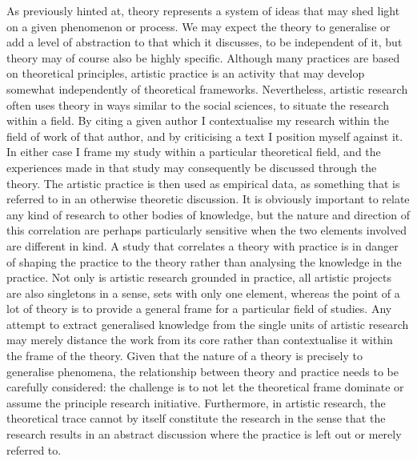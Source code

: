 \documentclass[12pt]{article}
\begin{document}
As previously hinted at, theory represents a system of ideas that may shed light on a given phenomenon or process. We may expect the theory to generalise or add a level of abstraction to that which it discusses, to be independent of it, but theory may of course also be highly specific. Although many practices are based on theoretical principles, artistic practice is an activity that may develop somewhat independently of theoretical frameworks. Nevertheless, artistic research often uses theory in ways similar to the social sciences, to situate the research within a field. By citing a given author I contextualise my research within the field of work of that author, and by criticising a text I position myself against it. In either case I frame my study within a particular theoretical field, and the experiences made in that study may  consequently be  discussed through the theory. The artistic practice is then used as empirical data, as something that is referred to in an otherwise theoretic discussion. It is obviously important to relate any kind of research to other bodies of knowledge, but the nature and direction of this correlation are perhaps particularly sensitive when the two elements involved are different in kind. A study that correlates a theory with practice is in danger of shaping the practice to the theory rather than analysing the knowledge in the practice. Not only is artistic research grounded in practice, all artistic projects are also singletons in a sense, sets with only one element, whereas the point of a lot of theory is to provide a general frame for a particular field of studies. Any attempt to extract generalised knowledge from the single units of artistic research may merely distance the work from its core rather than contextualise it within the frame of the theory. Given that the nature of a theory is precisely to generalise phenomena, the relationship between theory and practice needs to be carefully considered: the challenge is to not let the theoretical frame dominate or assume the principle research initiative. Furthermore, in artistic research, the theoretical trace cannot by itself constitute the research in the sense that the research results in an abstract discussion where the practice is left out or merely referred to.
\end{document}
